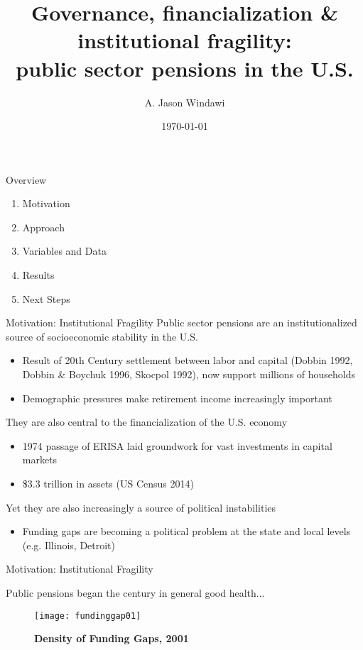 \documentclass{beamer}
\title{\textmd{Governance, financialization \& institutional fragility:\\
public sector pensions in the U.S.}}
\date{\today}
\author{A. Jason Windawi}
\institute{Department of Sociology\\Princeton University}
\begin{document}
\maketitle

\begin{frame}{\textmd{Overview}}
	\begin{enumerate}
		\item Motivation
		\item Approach
		\item Variables and Data
		\item Results
		\item Next Steps
		\end{enumerate} 
\end{frame}

\begin{frame}{\textmd{Motivation: Institutional Fragility}}
Public sector pensions are an institutionalized source of socioeconomic stability in the U.S. 
\begin{scriptsize}
\begin{itemize}
	\item Result of 20th Century settlement between labor and capital (Dobbin 1992, Dobbin \& Boychuk 1996, Skocpol 1992), now support millions of households
	\item Demographic pressures make retirement income increasingly important
\end{itemize}
\end{scriptsize}
They are also central to the financialization of the U.S. economy
\begin{scriptsize}
\begin{itemize}
	\item 1974 passage of ERISA laid groundwork for vast investments in capital markets
	\item \$3.3 trillion in assets (US Census 2014)
\end{itemize}
\end{scriptsize}
Yet they are also increasingly a source of political instabilities
\begin{scriptsize}
\begin{itemize}
	\item Funding gaps are becoming a political problem at the state and local levels (e.g. Illinois, Detroit)	
\end{itemize}
\end{scriptsize}
\end{frame}

\begin{frame}{\textmd{Motivation: Institutional Fragility}}
\begin{small}
Public pensions began the century in general good health...
\end{small} 
\begin{figure}
\caption*{\textbf{Density of Funding Gaps, 2001}} 	
    \texttt{[image: fundinggap01]}
    \end{figure}
\end{frame}
\end{document}
